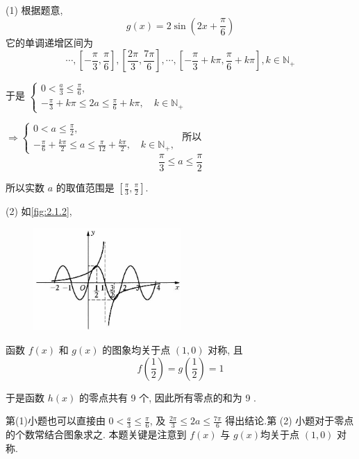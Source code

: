 \begin{solution}
	(1) 根据题意,
	$$
		g(x)=2 \sin \left(2 x+\frac{\pi}{6}\right)
	$$
	它的单调递增区间为
	$$
		\cdots,\left[-\frac{\pi}{3}, \frac{\pi}{6}\right],\left[\frac{2 \pi}{3}, \frac{7 \pi}{6}\right], \cdots,\left[-\frac{\pi}{3}+k \pi, \frac{\pi}{6}+k \pi\right], k \in \mathbb{N}_{+}
	$$

	于是 $\left\{\begin{array}{l}0<\frac{a}{3} \leqslant \frac{\pi}{6}, \\ -\frac{\pi}{3}+k \pi \leqslant 2 a \leqslant \frac{\pi}{6}+k \pi, \quad k \in \mathbb{N}_{+}\end{array}\right. $

	$\Rightarrow\left\{\begin{array}{l}0<a \leqslant \frac{\pi}{2}, \\ -\frac{\pi}{6}+\frac{k \pi}{2} \leqslant a \leqslant \frac{\pi}{12}+\frac{k \pi}{2}, \quad k \in \mathbb{N}_{+},\end{array}\right.$
	所以
	$$
		\frac{\pi}{3} \leqslant a \leqslant \frac{\pi}{2}
	$$

	所以实数 $a$ 的取值范围是 $\left[\frac{\pi}{3}, \frac{\pi}{2}\right]$.

	(2) 如\autoref{fig:2.1.2},
	\begin{figure}[ht]
		\centering
		\includegraphics[width=0.5\textwidth]{./images/2.1.1.jpg}
		\caption{}
		\label{fig:2.1.2}
	\end{figure}

	函数 $f(x)$ 和 $g(x)$ 的图象均关于点 $(1,0)$ 对称, 且
	$$
		f\left(\frac{1}{2}\right)=g\left(\frac{1}{2}\right)=1
	$$

	于是函数 $h(x)$ 的零点共有 9 个, 因此所有零点的和为 9 .
\end{solution}

\begin{note}
	第(1)小题也可以直接由 $0<\frac{a}{3} \leqslant \frac{\pi}{6}$, 及 $\frac{2 \pi}{3} \leqslant 2 a \leqslant \frac{7 \pi}{6}$ 得出结论.第 (2) 小题对于零点的个数常结合图象求之. 本题关键是注意到 $f(x)$ 与 $g(x)$均关于点 $(1,0)$ 对称.
\end{note}

